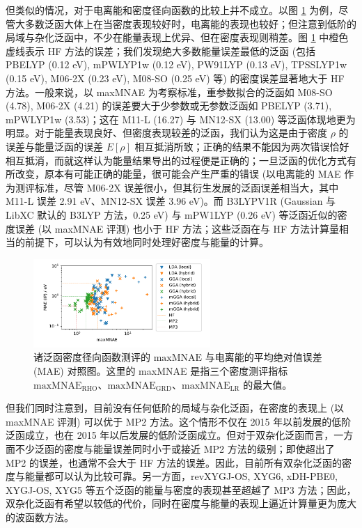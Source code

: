 但类似的情况，对于电离能和密度径向函数的比较上并不成立。以图 \ref{fig.4.compare-err-maxMNAE-MAEIP} 为例，尽管大多数泛函大体上在当密度表现较好时，电离能的表现也较好；但注意到低阶的局域与杂化泛函中，不少在能量表现上优异、但在密度表现则稍差。图 \ref{fig.4.compare-err-maxMNAE-MAEIP} 中橙色虚线表示 HF 方法的误差；我们发现绝大多数能量误差最低的泛函 (包括 PBELYP (0.12 eV), mPWLYP1w (0.12 eV), PW91LYP (0.13 eV), TPSSLYP1w (0.15 eV), M06-2X (0.23 eV), M08-SO (0.25 eV) 等) 的密度误差显著地大于 HF 方法。一般来说，以 maxMNAE 为考察标准，重参数拟合的泛函如 M08-SO (4.78), M06-2X (4.21) 的误差要大于少参数或无参数泛函如 PBELYP (3.71), mPWLYP1w (3.53)；这在 M11-L (16.27) 与 MN12-SX (13.00) 等泛函体现地更为明显。对于能量表现良好、但密度表现较差的泛函，我们认为这是由于密度 $\rho$ 的误差与能量泛函的误差 $E[\rho]$ 相互抵消所致；正确的结果不能因为两次错误恰好相互抵消，而就这样认为能量结果导出的过程便是正确的\cite{Hammes-Schiffer-Hammes-Schiffer.S.2017, Korth-Korth.ACIE.2017, Graziano-Graziano.NRC.2017}；一旦泛函的优化方式有所改变，原本有可能正确的能量，很可能会产生严重的错误 (以电离能的 MAE 作为测评标准，尽管 M06-2X 误差很小，但其衍生发展的泛函误差相当大，其中 M11-L 误差 2.91 eV、MN12-SX 误差 3.96 eV)。而 B3LYPV1R (Gaussian 与 LibXC 默认的 B3LYP 方法，0.25 eV) 与 mPW1LYP (0.26 eV) 等泛函近似的密度误差 (以 maxMNAE 评测) 也小于 HF 方法；这些泛函在与 HF 方法计算量相当的前提下，可以认为有效地同时处理好密度与能量的计算。

\begin{figure}[t]
    \centering
    \includegraphics[width=0.6\textwidth]{assets/compare-err-maxMNAE-MAEIP.pdf}
    \caption[诸泛函密度径向函数 $\text{maxMNAE}$ 与电离能 MAE 对照图]{诸泛函密度径向函数测评的 $\text{maxMNAE}$ 与电离能的平均绝对值误差 (MAE) 对照图。这里的 maxMNAE 是指三个密度测评指标 $\text{maxMNAE}_\text{RHO}$、$\text{maxMNAE}_\text{GRD}$、$\text{maxMNAE}_\text{LR}$ 的最大值。}
    \label{fig.4.compare-err-maxMNAE-MAEIP}
\end{figure}

但我们同时注意到，目前没有任何低阶的局域与杂化泛函，在密度的表现上 (以 maxMNAE 评测) 可以优于 MP2 方法。这个情形不仅在 2015 年以前发展的低阶泛函成立，也在 2015 年以后发展的低阶泛函成立。但对于双杂化泛函而言，一方面不少泛函的密度与能量误差同时小于或接近 MP2 方法的级别；即使超出了 MP2 的误差，也通常不会大于 HF 方法的误差。因此，目前所有双杂化泛函的密度与能量都可以认为比较可靠。另一方面，revXYGJ-OS, XYG6, xDH-PBE0, XYGJ-OS, XYG5 等五个泛函的能量与密度的表现甚至超越了 MP3 方法；因此，双杂化泛函有希望以较低的代价，同时在密度与能量的表现上逼近计算量更为庞大的波函数方法。

